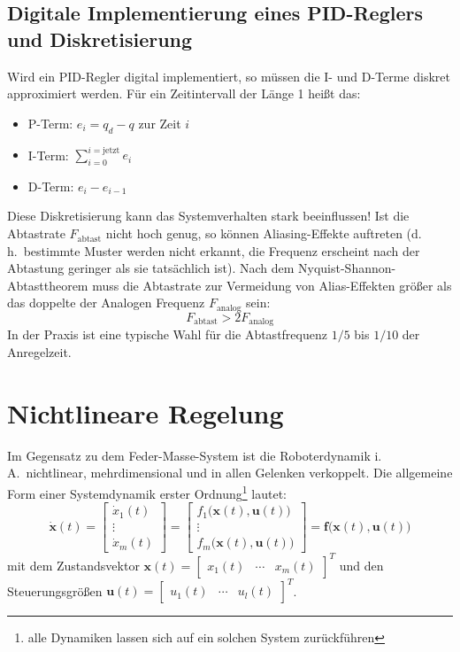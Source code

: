 \documentclass[a4paper, 11pt, accentcolor = tud3b]{tudreport}
\renewcommand{\vec}[1]{\boldsymbol{#1}}
\renewcommand{\dh}{d.\,h.~}
\newcommand{\iA}{i.\,A.~}
\begin{document}
			\subsection{Digitale Implementierung eines PID-Reglers und Diskretisierung}
				Wird ein PID-Regler digital implementiert, so müssen die I- und D-Terme diskret approximiert werden. Für ein Zeitintervall der Länge \num{1} heißt das:
				\begin{itemize}
					\item P-Term: \tabto{2cm} \( e_i = q_d - q \) zur Zeit \(i\)
					\item I-Term: \tabto{2cm} \( \sum_{i = 0}^{i = \text{jetzt}} e_i \)
					\item D-Term: \tabto{2cm} \( e_i - e_{i - 1} \)
				\end{itemize}
				Diese Diskretisierung kann das Systemverhalten stark beeinflussen! Ist die Abtastrate \( F_\text{abtast} \) nicht hoch genug, so können Aliasing-Effekte auftreten (\dh bestimmte Muster werden nicht erkannt, die Frequenz erscheint nach der Abtastung geringer als sie tatsächlich ist). Nach dem Nyquist-Shannon-Abtasttheorem muss die Abtastrate zur Vermeidung von Alias-Effekten größer als das doppelte der Analogen Frequenz \( F_\text{analog} \) sein:
				\begin{equation*}
					F_\text{abtast} > 2 F_\text{analog}
				\end{equation*}
				In der Praxis ist eine typische Wahl für die Abtastfrequenz \( 1/5 \) bis \( 1/10 \) der Anregelzeit.

		\section{Nichtlineare Regelung}
			Im Gegensatz zu dem Feder-Masse-System ist die Roboterdynamik \iA nichtlinear, mehrdimensional und in allen Gelenken verkoppelt. Die allgemeine Form einer Systemdynamik erster Ordnung\footnote{alle Dynamiken lassen sich auf ein solchen System zurückführen} lautet:
			\begin{equation*}
				\dot{\vec{x}}(t) =
					\begin{bmatrix}
						\dot{x}_1(t) \\
						\vdots \\
						\dot{x}_m(t)
					\end{bmatrix}
				=
					\begin{bmatrix}
						f_1\big(\vec{x}(t), \vec{u}(t)\big) \\
						\vdots \\
						f_m\big(\vec{x}(t), \vec{u}(t)\big)
					\end{bmatrix}
				= \vec{f}\big(\vec{x}(t), \vec{u}(t)\big)
			\end{equation*}
			mit dem Zustandsvektor \( \vec{x}(t) = \begin{bmatrix} x_1(t) & \cdots & x_m(t) \end{bmatrix}^T \) und den Steuerungsgrößen \( \vec{u}(t) = \begin{bmatrix} u_1(t) & \cdots & u_l(t) \end{bmatrix}^T \).
			
\end{document}
